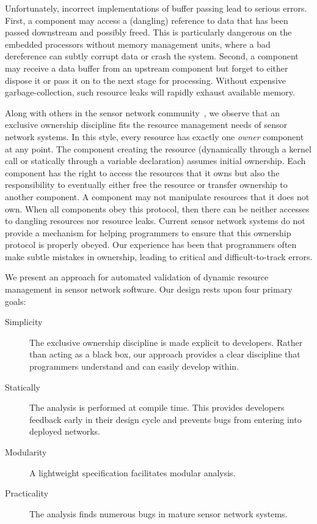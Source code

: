 Unfortunately, incorrect implementations of buffer passing lead to serious
errors.  
%
First, a component may access a (dangling) reference to data that has been
passed downstream and possibly freed.
%
This is particularly dangerous on the embedded processors without memory
management units, where a bad dereference can subtly corrupt data or crash
the system. 
%
Second, a component may receive a data buffer from an upstream component but
forget to either dispose it or pass it on to the next stage for processing.
%
Without expensive garbage-collection, such resource leaks will rapidly
exhaust available memory.



Along with others in the sensor network community~\cite{archer07interface}, we
observe that an exclusive ownership discipline fits the resource management 
needs of sensor network systems.
%
In this style, every resource has exactly one {\em owner} component at any
point.  
%
The component creating the resource (dynamically through a kernel call or
statically through a variable declaration) assumes initial ownership.  
%
Each component has the right to access the resources that it owns but also
the responsibility to eventually either free the resource or transfer
ownership to another component.  
%
A component may not manipulate resources that it does not own.  
%
When all components obey this protocol, then there can be neither accesses
to dangling resources nor resource leaks.
%
Current sensor network systems do not provide a mechanism for helping
programmers to ensure that this ownership protocol is properly obeyed.  
%
Our experience has been that programmers often make subtle mistakes in
ownership, leading to critical and difficult-to-track errors.  



We present an approach for automated validation of dynamic
resource management in sensor network software.  
%
Our design rests upon four primary goals:
%
\begin{description}
%
\item[Simplicity]  The exclusive ownership discipline is made explicit to
developers.
%
Rather than acting as a black box, our approach provides a clear discipline
that programmers understand and can easily develop within.
%
\item[Statically] The analysis is performed at compile time.  This provides
developers feedback early in their design cycle and prevents bugs from
entering into deployed networks.
%
\item[Modularity]  A lightweight specification facilitates modular analysis.
%
\item[Practicality] The analysis finds numerous bugs in mature sensor
network systems.
%
\end{description}



